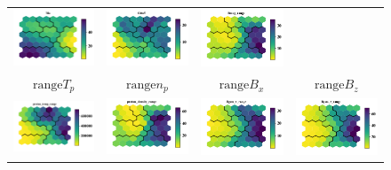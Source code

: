 \documentclass[utf8]{frontiersSCNS} %
\begin{document}
\begin{figure}[h!]
\begin{tabular}{CCCC}
		\includegraphics[width=4cm]{Amaya/comp-map-log_Ma} &
		\includegraphics[width=4cm]{Amaya/comp-map-log_C6to5} &
		\includegraphics[width=4cm]{Amaya/comp-map-log_Bmag_range}\hfill
		\\
		$\text{range} T_p $ & $\text{range} n_p$ & $\text{range} B_x$ & $\text{range} B_z$ \\
		\includegraphics[width=4cm]{Amaya/comp-map-log_proton_temp_range} &
		\includegraphics[width=4cm]{Amaya/comp-map-log_proton_density_range} &
		\includegraphics[width=4cm]{Amaya/comp-map-log_Bgsm_x_range} &
		\includegraphics[width=4cm]{Amaya/comp-map-log_Bgsm_z_range}\hfill

\end{tabular}
\end{figure}
\end{document}
